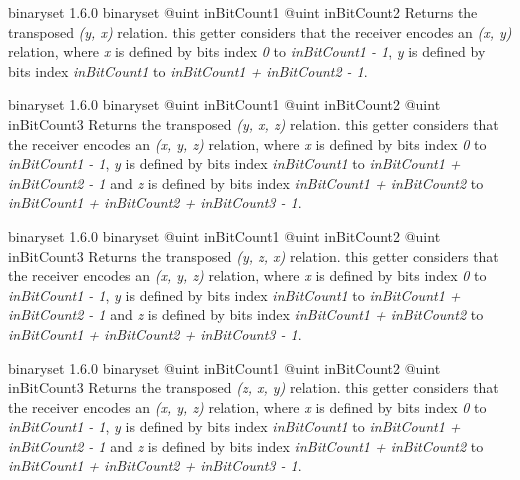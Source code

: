 {binaryset}
{1.6.0}
{binaryset}
{@uint inBitCount1}
{@uint inBitCount2}
{Returns the transposed \emph{(y, x)} relation.}
{this getter considers that the receiver encodes an \emph{(x, y)} relation, where \emph{x} is defined by bits index \emph{0} to \emph{inBitCount1  - 1}, \emph{y} is defined by bits index \emph{inBitCount1} to \emph{inBitCount1 + inBitCount2 - 1}.}







{binaryset}
{1.6.0}
{binaryset}
{@uint inBitCount1}
{@uint inBitCount2}
{@uint inBitCount3}
{Returns the transposed \emph{(y, x, z)} relation.}
{this getter considers that the receiver encodes an \emph{(x, y, z)} relation, where \emph{x} is defined by bits index \emph{0} to \emph{inBitCount1  - 1}, \emph{y} is defined by bits index \emph{inBitCount1} to \emph{inBitCount1 + inBitCount2 - 1} and  \emph{z} is defined by bits index \emph{inBitCount1 + inBitCount2} to \emph{inBitCount1 + inBitCount2 + inBitCount3 - 1}.}







{binaryset}
{1.6.0}
{binaryset}
{@uint inBitCount1}
{@uint inBitCount2}
{@uint inBitCount3}
{Returns the transposed \emph{(y, z, x)} relation.}
{this getter considers that the receiver encodes an \emph{(x, y, z)} relation, where \emph{x} is defined by bits index \emph{0} to \emph{inBitCount1  - 1}, \emph{y} is defined by bits index \emph{inBitCount1} to \emph{inBitCount1 + inBitCount2 - 1} and  \emph{z} is defined by bits index \emph{inBitCount1 + inBitCount2} to \emph{inBitCount1 + inBitCount2 + inBitCount3 - 1}.}







{binaryset}
{1.6.0}
{binaryset}
{@uint inBitCount1}
{@uint inBitCount2}
{@uint inBitCount3}
{Returns the transposed \emph{(z, x, y)} relation.}
{this getter considers that the receiver encodes an \emph{(x, y, z)} relation, where \emph{x} is defined by bits index \emph{0} to \emph{inBitCount1  - 1}, \emph{y} is defined by bits index \emph{inBitCount1} to \emph{inBitCount1 + inBitCount2 - 1} and  \emph{z} is defined by bits index \emph{inBitCount1 + inBitCount2} to \emph{inBitCount1 + inBitCount2 + inBitCount3 - 1}.}







